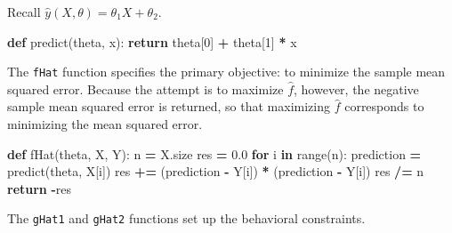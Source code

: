 \documentclass[12pt, twoside]{amherstthesis}
\newenvironment{Shaded}{\begin{snugshade}}{\end{snugshade}}
\newcommand{\BuiltInTok}[1]{#1}
\newcommand{\ControlFlowTok}[1]{\textcolor[rgb]{0.13,0.29,0.53}{\textbf{#1}}}
\newcommand{\DecValTok}[1]{\textcolor[rgb]{0.00,0.00,0.81}{#1}}
\newcommand{\FloatTok}[1]{\textcolor[rgb]{0.00,0.00,0.81}{#1}}
\newcommand{\KeywordTok}[1]{\textcolor[rgb]{0.13,0.29,0.53}{\textbf{#1}}}
\newcommand{\NormalTok}[1]{#1}
\newcommand{\OperatorTok}[1]{\textcolor[rgb]{0.81,0.36,0.00}{\textbf{#1}}}
\begin{document}
\noindent Recall \(\hat{y}(X, \theta) = \theta_1 X + \theta_2\).
\begin{Shaded}
\begin{Highlighting}[]
\KeywordTok{def}\NormalTok{ predict(theta, x):}
    \ControlFlowTok{return}\NormalTok{ theta[}\DecValTok{0}\NormalTok{] }\OperatorTok{+}\NormalTok{ theta[}\DecValTok{1}\NormalTok{] }\OperatorTok{*}\NormalTok{ x}
\end{Highlighting}
\end{Shaded}
\noindent The \texttt{fHat} function specifies the primary objective: to minimize the sample mean squared error. Because the attempt is to maximize \(\hat{f}\), however, the negative sample mean squared error is returned, so that maximizing \(\hat{f}\) corresponds to minimizing the mean squared error.
\begin{Shaded}
\begin{Highlighting}[]
\KeywordTok{def}\NormalTok{ fHat(theta, X, Y):}
\NormalTok{    n }\OperatorTok{=}\NormalTok{ X.size          }
\NormalTok{    res }\OperatorTok{=} \FloatTok{0.0}           
    \ControlFlowTok{for}\NormalTok{ i }\KeywordTok{in} \BuiltInTok{range}\NormalTok{(n):  }
\NormalTok{        prediction }\OperatorTok{=}\NormalTok{ predict(theta, X[i])                }
\NormalTok{        res }\OperatorTok{+=}\NormalTok{ (prediction }\OperatorTok{{-}}\NormalTok{ Y[i]) }\OperatorTok{*}\NormalTok{ (prediction }\OperatorTok{{-}}\NormalTok{ Y[i]) }
\NormalTok{    res }\OperatorTok{/=}\NormalTok{ n            }
    \ControlFlowTok{return} \OperatorTok{{-}}\NormalTok{res         }
\end{Highlighting}
\end{Shaded}
\noindent The \texttt{gHat1} and \texttt{gHat2} functions set up the behavioral constraints.
\end{document}
